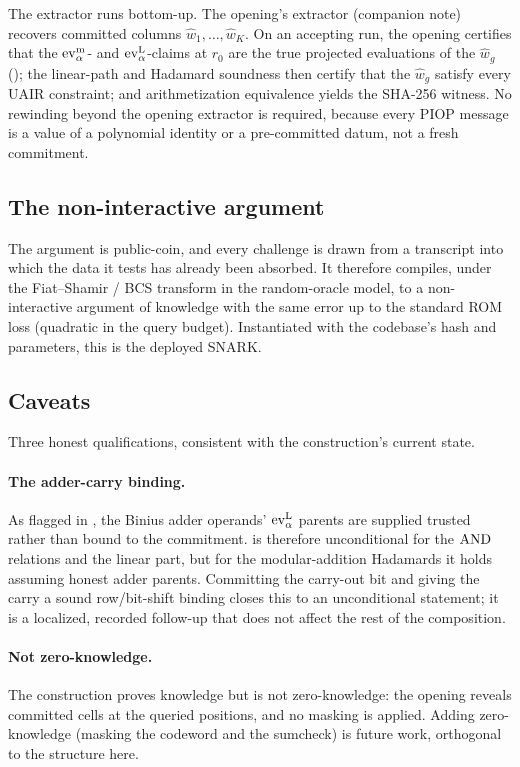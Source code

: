 The extractor runs bottom-up. The opening's extractor (companion note) recovers
committed columns $\widehat w_1,\dots,\widehat w_K$. On an accepting run, the
opening certifies that the $\operatorname{ev}^{\mathrm{m}}_{\alpha}$- and $\operatorname{ev}^{\mathrm{L}}_{\alpha}$-claims at $r_0$ are the true
projected evaluations of the $\widehat w_g$ (); the
linear-path and Hadamard soundness then certify that the $\widehat w_g$ satisfy
every UAIR constraint; and arithmetization equivalence yields the SHA-256
witness. No rewinding beyond the opening extractor is required, because every
PIOP message is a value of a polynomial identity or a pre-committed datum, not a
fresh commitment.

\subsection{The non-interactive argument}
\label{sec:fiat-shamir}

The argument is public-coin, and every challenge is drawn from a transcript into
which the data it tests has already been absorbed. It therefore compiles, under
the Fiat--Shamir / BCS transform in the random-oracle model, to a non-interactive
argument of knowledge with the same error up to the standard ROM loss (quadratic
in the query budget). Instantiated with the codebase's hash and parameters, this
is the deployed SNARK.

\subsection{Caveats}
\label{sec:caveats}

Three honest qualifications, consistent with the construction's current state.

\paragraph{The adder-carry binding.} As flagged in , the
Binius adder operands' $\operatorname{ev}^{\mathrm{L}}_{\alpha}$ parents are supplied trusted rather than bound to
the commitment.  is therefore unconditional for the $\operatorname{AND}$
relations and the linear part, but for the modular-addition Hadamards it holds
assuming honest adder parents. Committing the carry-out bit and giving the carry
a sound row/bit-shift binding closes this to an unconditional statement; it is a
localized, recorded follow-up that does not affect the rest of the composition.

\paragraph{Not zero-knowledge.} The construction proves knowledge but is not
zero-knowledge: the opening reveals committed cells at the queried positions, and
no masking is applied. Adding zero-knowledge (masking the codeword and the
sumcheck) is future work, orthogonal to the structure here.

